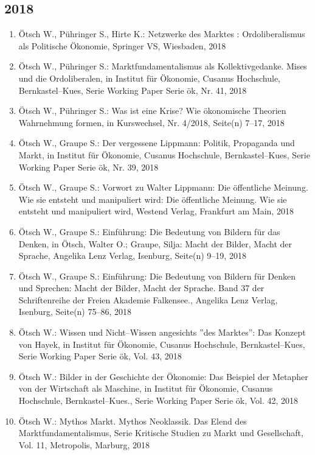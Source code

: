 \subsection*{2018}
\begin{enumerate}
    	 \item Ötsch W., Pühringer S., Hirte K.: Netzwerke des Marktes : Ordoliberalismus als Politische Ökonomie, Springer VS, Wiesbaden, 2018
	 \item Ötsch W., Pühringer S.: Marktfundamentalismus als Kollektivgedanke. Mises und die Ordoliberalen, in Institut für Ökonomie, Cusanus Hochschule, Bernkastel--Kues, Serie Working Paper Serie ök, Nr. 41, 2018
	 \item Ötsch W., Pühringer S.: Was ist eine Krise? Wie ökonomische Theorien Wahrnehmung formen, in Kurswechsel, Nr. 4/2018, Seite(n) 7--17, 2018
	 \item Ötsch W., Graupe S.: Der vergessene Lippmann: Politik, Propaganda und Markt, in Institut für Ökonomie, Cusanus Hochschule, Bernkastel--Kues, Serie Working Paper Serie ök, Nr. 39, 2018
	 \item Ötsch W., Graupe S.: Vorwort zu Walter Lippmann: Die öffentliche Meinung. Wie sie entsteht und manipuliert wird: Die öffentliche Meinung. Wie sie entsteht und manipuliert wird, Westend Verlag, Frankfurt am Main, 2018
	 \item Ötsch W., Graupe S.: Einführung: Die Bedeutung von Bildern für das Denken, in Ötsch, Walter O.; Graupe, Silja: Macht der Bilder, Macht der Sprache, Angelika Lenz Verlag, Isenburg, Seite(n) 9--19, 2018
	 \item Ötsch W., Graupe S.: Einführung: Die Bedeutung von Bildern für Denken und Sprechen: Macht der Bilder, Macht der Sprache. Band 37 der Schriftenreihe der Freien Akademie Falkensee., Angelika Lenz Verlag, Isenburg, Seite(n) 75–86, 2018
	 \item Ötsch W.: Wissen und Nicht--Wissen angesichts ''des Marktes'': Das Konzept von Hayek, in Institut für Ökonomie, Cusanus Hochschule, Bernkastel--Kues, Serie Working Paper Serie ök, Vol. 43, 2018
	 \item Ötsch W.: Bilder in der Geschichte der Ökonomie: Das Beispiel der Metapher von der Wirtschaft als Maschine, in Institut für Ökonomie, Cusanus Hochschule, Bernkastel--Kues., Serie Working Paper Serie ök, Vol. 42, 2018
	 \item Ötsch W.: Mythos Markt. Mythos Neoklassik. Das Elend des Marktfundamentalismus, Serie Kritische Studien zu Markt und Gesellschaft, Vol. 11, Metropolis, Marburg, 2018

\end{enumerate}
